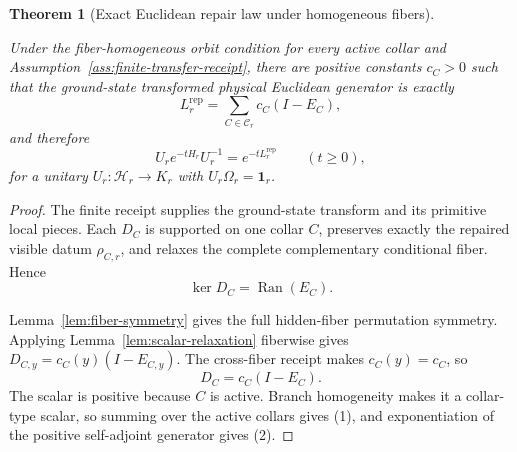 \documentclass[11pt]{article}
\numberwithin{equation}{section}
\newtheorem{theorem}{Theorem}[section]
\theoremstyle{remark}
\newcommand{\Rep}{\mathrm{rep}}
\newcommand{\Hcal}{\mathcal H}
\begin{document}
\begin{theorem}[Exact Euclidean repair law under homogeneous fibers]
\label{thm:ec-law}
\leavevmode\par
Under the fiber-homogeneous orbit condition for every active collar and
Assumption~\ref{ass:finite-transfer-receipt}, there are positive constants
\(c_C>0\) such that the ground-state transformed physical Euclidean
generator is exactly
\[
L_r^{\Rep}=\sum_{C\in\mathcal C_r} c_C(I-E_C),
\tag{1}
\]
and therefore
\[
U_r e^{-tH_r}U_r^{-1}=e^{-tL_r^{\Rep}}
\qquad(t\ge0),
\tag{2}
\]
for a unitary \(U_r:\Hcal_r\to K_r\) with \(U_r\Omega_r=\mathbf 1_r\).
\end{theorem}

\begin{proof}
The finite receipt supplies the ground-state transform and its primitive local pieces. Each
\(D_C\) is supported on one collar \(C\), preserves exactly the repaired visible datum
\(\rho_{C,r}\), and relaxes the complete complementary conditional fiber. Hence
\[
\ker D_C=\operatorname{Ran}(E_C).
\]

Lemma~\ref{lem:fiber-symmetry} gives the full hidden-fiber permutation symmetry. Applying
Lemma~\ref{lem:scalar-relaxation} fiberwise gives
\(D_{C,y}=c_C(y)(I-E_{C,y})\). The cross-fiber receipt makes \(c_C(y)=c_C\), so
\[
D_C=c_C(I-E_C).
\]
The scalar is positive because \(C\) is active. Branch homogeneity makes it a collar-type scalar,
so summing over the active collars gives (1), and exponentiation of the positive self-adjoint
generator gives (2).
\end{proof}
\end{document}
